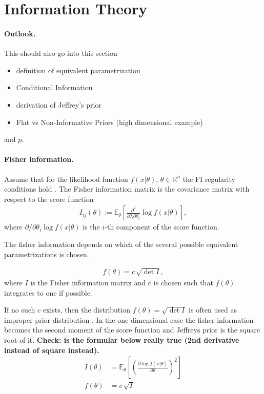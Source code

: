 \section{Information Theory}
\paragraph*{Outlook.} This should also go into this section 
\begin{itemize}
\item definition of equivalent parametrization
\item Conditional Information
\item derivation of Jeffrey's prior
\item Flat vs Non-Informative Priors (high dimensional example)
\end{itemize}
 and $p$. \cite{barber}
 
\paragraph{Fisher information.}
\begin{definition} Assume that for the likelihood function $f(x|\theta)$, $\theta \in \mathbb{R}^n$ the FI regularity conditions hold \cite{schervish}. The Fisher information matrix is the covariance matrix with respect to the score function
\begin{align*}
I_{ij}(\theta) :=  \mathbb{E}_\theta \left[ \frac{\partial^2}{\partial \theta_i\partial \theta_j} \log f(x|\theta) \right], 
\end{align*}
where $\partial / \partial \theta_i \log f(x|\theta)$ is the $i$-th component of the score function. 
\end{definition} 
The fisher information depends on which of the several possible equivalent parametrizations is chosen. 

\begin{definition} 
\begin{align*}
f(\theta) = c\, \sqrt{\det I},
\end{align*}
where $I$ is the Fisher information matrix and c is chosen such that $f(\theta)$ integrates to one if possible.  
\end{definition} 
If no such $c$ exists, then the  distribution $f(\theta)=\sqrt{\det I}$ is often used as improper prior distribution \cite{schervish}.
In the one dimensional case the fisher information becomes the second moment of the score function and Jeffreys prior is the square root of it. \textbf{Check: is the formular below really true (2nd derivative instead of square instead). }
\begin{align}
I(\theta)&=\mathbb{E}_\theta \left[\left( \frac{\partial \log f(x|\theta)}{\partial \theta}  \right) ^2\right] \\
f(\theta)&= c\, \sqrt{I}
\end{align} 

